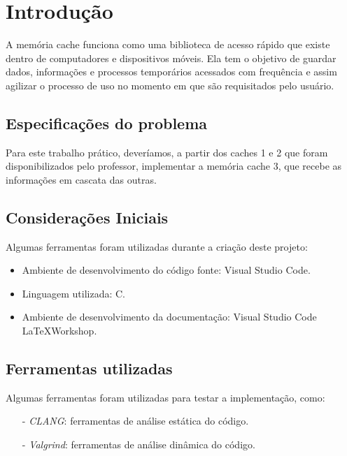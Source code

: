 \documentclass{article}
\begin{document}



\section{Introdução}
A memória cache funciona como uma biblioteca de acesso rápido que existe dentro de computadores e dispositivos móveis. Ela tem o objetivo de guardar dados, informações e processos temporários acessados com frequência e assim agilizar o processo de uso no momento em que são requisitados pelo usuário.

\subsection{Especificações do problema}

Para este trabalho prático, deveríamos, a partir dos caches 1 e 2 que foram disponibilizados pelo professor, implementar a memória cache 3, que recebe as informações em cascata das outras.
\subsection{Considerações Iniciais}
Algumas ferramentas foram utilizadas durante a criação deste projeto:

\begin{itemize}
  \item Ambiente de desenvolvimento do código fonte: Visual Studio Code.
  \item Linguagem utilizada: C.
  \item Ambiente de desenvolvimento da documentação: Visual Studio Code \LaTeX Workshop.
\end{itemize}

\subsection{Ferramentas utilizadas}
Algumas ferramentas foram utilizadas para testar a implementação, como:

\begin{itemize}
    \item[-] \textit{CLANG}: ferramentas de análise estática do código.
    \item[-] \textit{Valgrind}: ferramentas de análise dinâmica do código.
\end{itemize}
\end{document}
